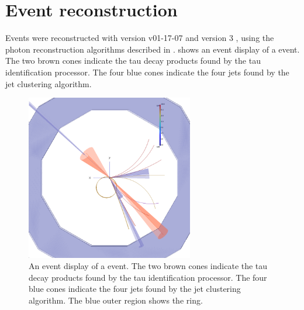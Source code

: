 \section{Event reconstruction}


Events were reconstructed with  \ilcsoft version v01-17-07 \cite{Gaede:82475} and \pandora version 3 \cite{Marshall:2015rfa}, using the photon reconstruction algorithms described in .  shows an event display of a \eeZZQQ event. The two brown cones indicate the tau decay products found by the tau identification processor. The four blue cones indicate the four jets found by the jet clustering algorithm.





\begin{figure}[htbp]
\centering %
  \includegraphics[width=0.65\textwidth]{tau/NoTimeAnalysis/EvtDsp}
  \caption{An event display of a \eeZZQQ event. The two brown cones indicate the tau decay products found by the tau identification processor. The four blue cones indicate the four jets found by the jet clustering algorithm. The blue outer region shows the \HCAL ring.}
  \label{fig:TauNTAevtDsp}
\end{figure}


